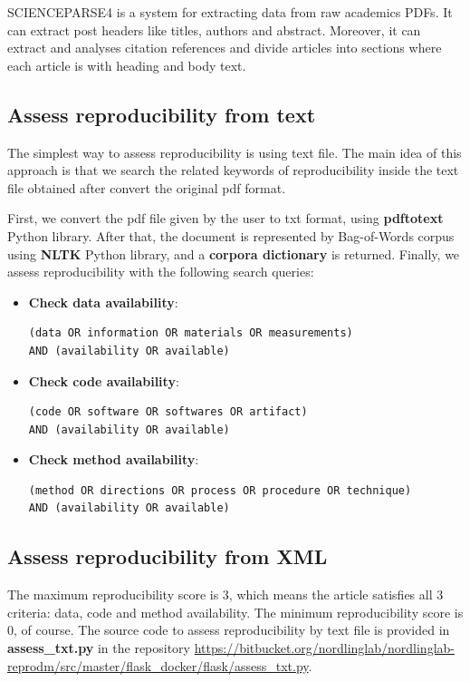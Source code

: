\documentclass[
10pt, %
a4paper, %
oneside, %
headinclude,footinclude, %
BCOR5mm, %
]{scrartcl}
\begin{document}
SCIENCEPARSE4 is a system for extracting data from raw academics PDFs. It can extract post headers like titles, authors and abstract. 
Moreover, it can extract and analyses citation references and divide articles into sections where each article is with heading and body text.  

\subsection{Assess reproducibility from text}
The simplest way to assess reproducibility is using text file. The main idea of this approach is that we search the related keywords of reproducibility inside the text file obtained after convert the original pdf format.

First, we convert the pdf file given by the user to txt format, using \textbf{pdftotext} Python library.
After that, the document is represented by Bag-of-Words corpus using \textbf{NLTK} Python library, and a \textbf{corpora dictionary} is returned.
Finally, we assess reproducibility with the following search queries:
\begin{itemize}
\item \textbf{Check data availability}:
\begin{verbatim}
(data OR information OR materials OR measurements)
AND (availability OR available)
\end{verbatim}
\item \textbf{Check code availability}:
\begin{verbatim}
(code OR software OR softwares OR artifact)
AND (availability OR available)
\end{verbatim}
\item \textbf{Check method availability}:
\begin{verbatim}
(method OR directions OR process OR procedure OR technique)
AND (availability OR available)
\end{verbatim}
\end{itemize}
\subsection{Assess reproducibility from XML}


The maximum reproducibility score is 3, which means the article satisfies all 3 criteria: data, code and method availability. The minimum reproducibility score is 0, of course.
The source code to assess reproducibility by text file is provided in \textbf{assess\_txt.py} in the repository \url{https://bitbucket.org/nordlinglab/nordlinglab-reprodm/src/master/flask_docker/flask/assess_txt.py}.
\end{document}
